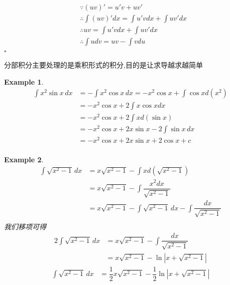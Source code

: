 \documentclass[11pt,hyperref,a4paper,UTF8]{ctexart}
\newtheorem{example}{Example}[subsection]
\newenvironment{cproof}{%
\heiti{证明}\kaishu
}{%
  \hfill $\square$
  \par\bigskip
}
\begin{document}
\begin{CJK}{UTF8}{gkai}
\begin{cproof}
\[
\begin{aligned}  
&\because (uv)' = u'v + uv'\\
&\therefore\int(uv)'dx = \int u' v dx + \int u v' dx\\
&\therefore uv = \int u' v dx + \int u v' dx\\
&\therefore \int u dv = uv- \int v du\\
\end{aligned}
\]
\end{cproof}
分部积分主要处理的是乘积形式的积分,目的是让求导越求越简单\\
\begin{example}
  \[
  \begin{aligned}  
  \int x^2 \sin x \, dx &= -\int x^2 \cos x\, dx = -x^2 \cos x + \int \cos x d(x^2) \\
  &= -x^2 \cos x + 2\int x\cos x dx \\ 
  &= -x^2 \cos x + 2\int x d(\sin x)\\
  &= -x^2 \cos x + 2 x \sin x - 2 \int \sin x\, dx  \\
  &=-x^2 \cos x + 2 x \sin x + 2 \cos x + c\\
  \end{aligned}
  \]
\end{example}

\begin{example}
  \[
  \begin{aligned}  
  \int \sqrt{x^2 - 1}\, dx &= x\sqrt{x^2 -1} - \int x d(\sqrt{x^2 -1})\\
  &= x\sqrt{x^2 -1} - \int \dfrac{x^2 dx}{\sqrt{x^2 -1}} \\
  &= x\sqrt{x^2 -1} - \int\sqrt{x^2 -1}\, dx - \int \dfrac{dx}{\sqrt{x^2 -1}}\\
  \end{aligned}
  \]
  我们移项可得
  \[
    \begin{aligned}  
    2\int \sqrt{x^2 - 1} \,dx &= x\sqrt{x^2 -1} - \int \dfrac{dx}{\sqrt{x^2 -1}}\\
    &= x\sqrt{x^2 -1} - \ln\left|x + \sqrt{x^2 - 1} \right|
    \end{aligned}
    \]
  \[
    \begin{aligned}  
    \int \sqrt{x^2 - 1} \,dx &= \dfrac{1}{2}x\sqrt{x^2 -1} - \dfrac{1}{2}\ln\left|x + \sqrt{x^2 - 1} \right|
    \end{aligned}
    \]

\end{example}


\end{CJK}
\end{document}
